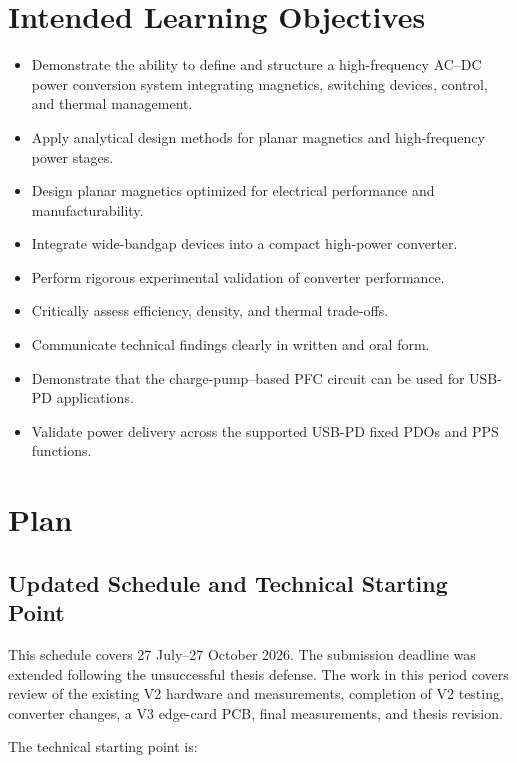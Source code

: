 \documentclass[12pt,a4paper]{report}
\begin{document}
\chapter{Intended Learning Objectives}

\begin{itemize}
    \item Demonstrate the ability to define and structure a high-frequency AC--DC power conversion system integrating magnetics, switching devices, control, and thermal management.
    \item Apply analytical design methods for planar magnetics and high-frequency power stages.
    \item Design planar magnetics optimized for electrical performance and manufacturability.
    \item Integrate wide-bandgap devices into a compact high-power converter.
    \item Perform rigorous experimental validation of converter performance.
    \item Critically assess efficiency, density, and thermal trade-offs.
    \item Communicate technical findings clearly in written and oral form.
    \item Demonstrate that the charge-pump--based PFC circuit can be used for USB-PD applications.
    \item Validate power delivery across the supported USB-PD fixed PDOs and PPS functions.
\end{itemize}

\chapter{Plan}

\section{Updated Schedule and Technical Starting Point}

This schedule covers 27 July--27 October 2026. The submission deadline was extended following the unsuccessful thesis defense. The work in this period covers review of the existing V2 hardware and measurements, completion of V2 testing, converter changes, a V3 edge-card PCB, final measurements, and thesis revision.

The technical starting point is:
\end{document}
